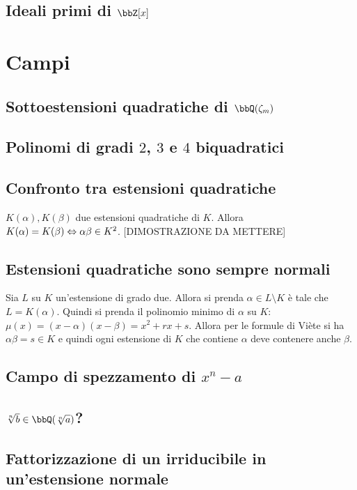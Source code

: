 \documentclass[a4paper,NoNotes,GeneralMath]{stdmdoc}
\begin{document}
	\subsection{Ideali primi di $\bbZ[x]$}
	
	\section{Campi}
	\subsection{Sottoestensioni quadratiche di $\bbQ(\zeta_m)$}
	
	\subsection{Polinomi di gradi $2$, $3$ e $4$ biquadratici}
	
	\subsection{Confronto tra estensioni quadratiche}
	$K(\alpha), K(\beta)$ due estensioni quadratiche di $K$. Allora $K(\alpha) = K(\beta) \Leftrightarrow \alpha\beta \in K^2$.
	[DIMOSTRAZIONE DA METTERE]
	
	\subsection{Estensioni quadratiche sono sempre normali}
	Sia $L$ su $K$ un'estensione di grado due. Allora si prenda $\alpha \in L \setminus K$ è tale che $L = K(\alpha)$. Quindi si prenda il polinomio minimo di $\alpha$ su $K$: $\mu(x) = (x-\alpha)(x-\beta) = x^2 + rx + s$. Allora per le formule di Viète si ha $\alpha\beta = s \in K$ e quindi ogni estensione di $K$ che contiene $\alpha$ deve contenere anche $\beta$.
	
	\subsection{Campo di spezzamento di $x^n - a$}
	
	\subsection{$\sqrt[n]{b} \in \bbQ(\sqrt[n]{a})$?}
	
	\subsection{Fattorizzazione di un irriducibile in un'estensione normale}
	
\end{document}
